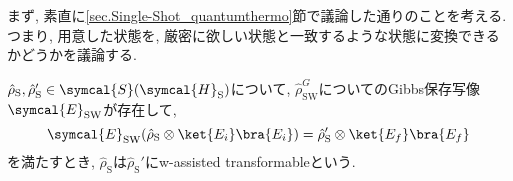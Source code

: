 


まず, 素直に\ref{sec.Single-Shot_quantumthermo}節で議論した通りのことを考える. 
つまり, 用意した状態を, 厳密に欲しい状態と一致するような状態に変換できるかどうかを議論する. 

\begin{mydfn}
  $\hat{\rho}_\text{S}, \hat{\rho}_\text{S}'\in\symcal{S}(\symcal{H}_{\text{S}})$について, $\hat{\rho}_{\text{SW}}^G$についてのGibbs保存写像$\symcal{E}_{\text{SW}}$が存在して, 
  \begin{equation}
    \symcal{E}_{\text{SW}}(\hat{\rho}_{\text{S}}\otimes\ket{E_i}\bra{E_i})=\hat{\rho}_{\text{S}}'\otimes\ket{E_f}\bra{E_f}
  \end{equation}
  を満たすとき, $\hat{\rho}_\text{S}$は$\hat{\rho}_\text{S}'$にw-assisted transformableという. 
\end{mydfn}

